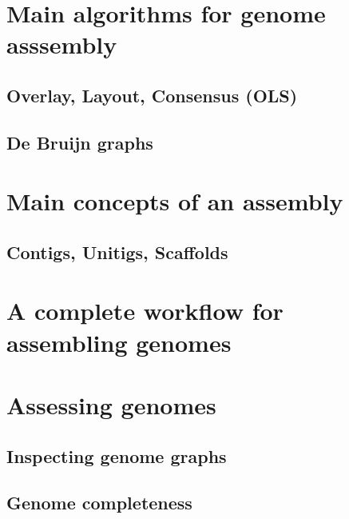 \documentclass[
  letterpaper,
  DIV=11,
  numbers=noendperiod,
  oneside]{scrreprt}
\begin{document}
\hypertarget{main-algorithms-for-genome-asssembly}{%
\section{Main algorithms for genome
asssembly}\label{main-algorithms-for-genome-asssembly}}

\hypertarget{overlay-layout-consensus-ols}{%
\subsection{Overlay, Layout, Consensus
(OLS)}\label{overlay-layout-consensus-ols}}

\hypertarget{de-bruijn-graphs}{%
\subsection{De Bruijn graphs}\label{de-bruijn-graphs}}

\hypertarget{main-concepts-of-an-assembly}{%
\section{Main concepts of an
assembly}\label{main-concepts-of-an-assembly}}

\hypertarget{contigs-unitigs-scaffolds}{%
\subsection{Contigs, Unitigs,
Scaffolds}\label{contigs-unitigs-scaffolds}}

\hypertarget{a-complete-workflow-for-assembling-genomes}{%
\section{A complete workflow for assembling
genomes}\label{a-complete-workflow-for-assembling-genomes}}

\hypertarget{assessing-genomes}{%
\section{Assessing genomes}\label{assessing-genomes}}

\hypertarget{inspecting-genome-graphs}{%
\subsection{Inspecting genome graphs}\label{inspecting-genome-graphs}}

\hypertarget{genome-completeness}{%
\subsection{Genome completeness}\label{genome-completeness}}
\end{document}
